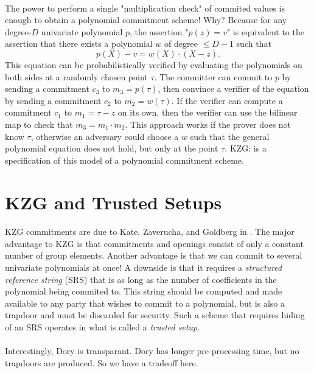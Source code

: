 \documentclass[11pt]{article}
\begin{document}
\paragraph{} The power to perform a single "multiplication check" of commited values is enough to obtain a polynomial commitment scheme! Why? Because for any degree-$D$ univariate polynomial $p$, the assertion "$p(z) = v$" is equivalent to the assertion that there exists a polynomial $w$ of degree $\leq D - 1$ such that
\[ p(X) - v = w(X) \cdot (X - z). \]
This equation can be probabilistically verified by evaluating the polynomials on both sides at a randomly chosen point $\tau$. The committer can commit to $p$ by sending a commitment $c_3$ to $m_3 = p(\tau)$, then convince a verifier of the equation by sending a commitment $c_2$ to $m_2 = w(\tau)$. If the verifier can compute a commitment $c_1$ to $m_1 = \tau - z$ on its own, then the verifier can use the bilinear map to check that $m_3 = m_1 \cdot m_2$. This approach works if the prover does not know $\tau$, otherwise an adversary could choose a $w$ such that the general polynomial equation does not hold, but only at the point $\tau$. KZG: is a specification of this model of a polynomial commitment scheme.

\section{KZG and Trusted Setups}
\paragraph{} KZG commitments are due to Kate, Zaverucha, and Goldberg in \cite{kzg10}. The major advantage to KZG is that commitments and openings consist of only a constant number of group elements. Another advantage is that we can commit to several univariate polynomials at once! A downside is that it requires a \textit{structured reference string} (SRS) that is as long as the number of coefficients in the polynomial being commited to. This string should be computed and made available to any party that wishes to commit to a polynomial, but is also a trapdoor and must be discarded for security. Such a scheme that requires hiding of an SRS operates in what is called a \textit{trusted setup}.

\paragraph{} Interestingly, Dory is transparant. Dory has longer pre-processing time, but no trapdoors are produced. So we have a tradeoff here.
\end{document}
